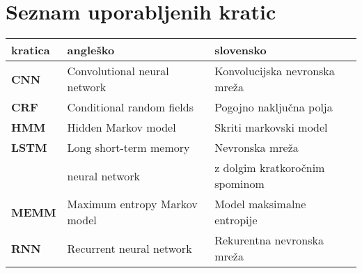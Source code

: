 ﻿\chapter*{Seznam uporabljenih kratic}

\begin{tabular}{l|l|l}
  {\bf kratica} & {\bf angleško} & {\bf slovensko} \\ \hline
  {\bf CNN} & Convolutional neural network & Konvolucijska nevronska mreža \\
  {\bf CRF} & Conditional random fields & Pogojno naključna polja \\
  {\bf HMM} & Hidden Markov model & Skriti markovski model \\
  {\bf LSTM} & Long short-term memory & Nevronska mreža \\
             & neural network &  z dolgim kratkoročnim spominom \\
  {\bf MEMM} & Maximum entropy Markov model & Model maksimalne entropije \\
  {\bf RNN} & Recurrent neural network & Rekurentna nevronska mreža \\
\end{tabular}

